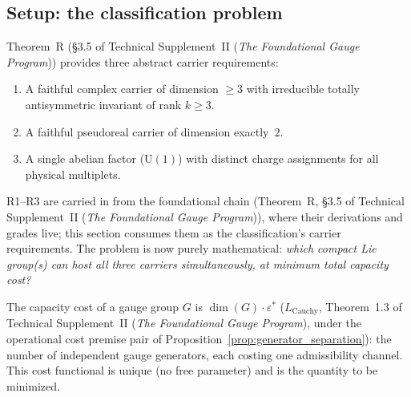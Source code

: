 \documentclass[11pt]{article}
\theoremstyle{definition}
\newcommand{\U}{\mathrm{U}}
\newcommand{\TSII}{Technical Supplement~II (\emph{The Foundational Gauge Program})}
\begin{document}
%
%


\subsection{Setup: the classification problem}
\label{sec:gauge_setup}

Theorem~R (\S3.5 of \TSII{}) provides three abstract carrier
requirements:
\begin{enumerate}[label=\textbf{R\arabic*},nosep,leftmargin=3em]
  \item A faithful complex carrier of dimension $\ge 3$ with irreducible
        totally antisymmetric invariant of rank $k \ge 3$.
  \item A faithful pseudoreal carrier of dimension exactly~$2$.
  \item A single abelian factor ($\U(1)$) with distinct charge
        assignments for all physical multiplets.
\end{enumerate}
R1--R3 are carried in from the foundational chain (Theorem~R,
\S3.5 of \TSII{}), where their derivations and grades live; this
section consumes them as the classification's carrier requirements.
The problem is now purely mathematical: \emph{which compact Lie group(s)
can host all three carriers simultaneously, at minimum total capacity cost?}

The capacity cost of a gauge group $G$ is $\dim(G) \cdot \varepsilon^*$
($L_{\mathrm{Cauchy}}$, Theorem~1.3 of \TSII{}, under the
operational cost premise pair of
Proposition~\ref{prop:generator_separation}): the number of
independent gauge generators, each costing one admissibility channel.
This cost functional is unique (no free parameter) and is the quantity
to be minimized.
\end{document}
